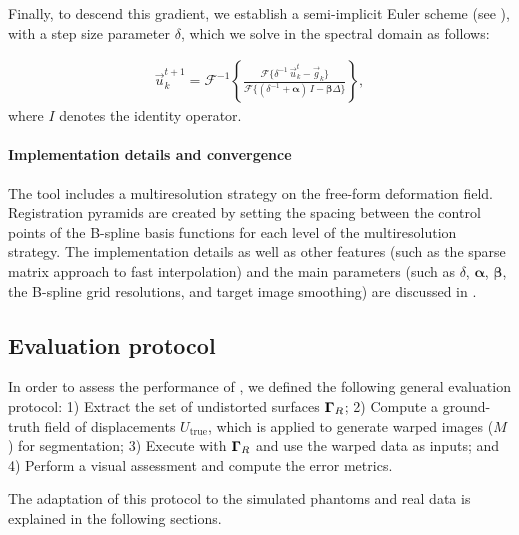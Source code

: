 Finally, to descend this gradient, we establish a semi-implicit Euler scheme (see ),
  with a step size parameter $\delta$, which we solve in the spectral domain as follows:

  \begin{align}
  \vec{u}_k^{t+1} = \mathcal{F}^{-1}\left\{ \frac{\mathcal{F}\{\delta^{-1} \, \vec{u}_k^t - \vec{g}_k\} }
                    {\mathcal{F}\{(\delta^{-1} + \boldsymbol{\alpha})\, I - \boldsymbol{\beta}\Delta\}} \right\},
  \label{eq:regseg-update_equation}
  \end{align}
  where $I$ denotes the identity operator.


\paragraph*{Implementation details and convergence}%
\label{sec:regseg-conv_report}
The \regseg{} tool includes a multiresolution strategy on the free-form deformation field.
Registration pyramids are created by setting the spacing between the control points of the B-spline basis
  functions for each level of the multiresolution strategy.
The implementation details as well as other features (such as the sparse matrix approach
  to fast interpolation) and the main parameters
  (such as $\delta$, $\boldsymbol{\alpha}$, $\boldsymbol{\beta}$, the B-spline grid resolutions,
  and target image smoothing) are discussed in .

\subsection{Evaluation protocol}\label{sec:regseg-evaluation_protocol}
In order to assess the performance of \regseg{}, we defined the following general
  evaluation protocol:
1) Extract the set of undistorted surfaces $\boldsymbol{\Gamma}_R$;
2) Compute a ground-truth field of displacements $U_\text{true}$, which is applied to
  generate warped images ($M$) for segmentation;
3) Execute \regseg{} with $\boldsymbol{\Gamma}_R$ and use the warped data as inputs; and
4) Perform a visual assessment and compute the error metrics.

The adaptation of this protocol to the simulated phantoms and real data is explained in the
  following sections.

